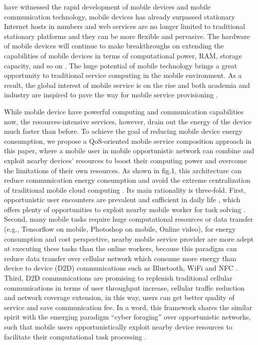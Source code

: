 \documentclass[10pt,journal,compsoc]{IEEEtran}
\begin{document}
 have witnessed the rapid development of mobile devices and mobile communication technology, mobile devices has already surpassed stationary Internet hosts in numbers and web services are no longer limited to traditional stationary platforms and they can be more flexible and pervasive. The hardware of mobile devices will continue to make breakthroughs on extending the capabilities of mobile devices in terms of computational power, RAM, storage capacity, and so on \cite{Deng2017}. The huge potential of mobile technology brings a great opportunity to traditional service computing in the mobile environment. As a result, the global interest of mobile service is on the rise and both academia and industry are inspired to pave the way for mobile service provisioning \cite{dinh2013survey,hu2014multidimensional}.

While mobile device have powerful computing and communication capabilities now, the resources-intensive services, however, drain out the energy of the device much faster than before. 
To achieve the goal of reducing mobile device energy consumption, we propose a QoS-oriented mobile service composition approach in this paper, where a mobile user in mobile opportunistic network can combine and exploit nearby devices' resources to boost their computing power and overcome the limitations of their own resources. As shown in fig.1, this architecture can reduce communication energy consumption and avoid the extreme centralization of traditional mobile cloud computing \cite{Giordano2011}. Its main rationality is three-fold. First, opportunistic user encounters are prevalent and sufficient in daily life \cite{liu2013exploring}, which offers plenty of opportunities to exploit nearby mobile worker for task solving \cite{chang2015progressive,heimerl2012communitysourcing,agapie2015crowdsourcing}. Second, many mobile tasks require huge computational resources or data transfer (e.g., Tensorflow on mobile, Photoshop on mobile, Online video), for energy consumption and cost perspective, nearby mobile service provider are more adept at executing these tasks than the online workers, because this paradigm can reduce data transfer over cellular network which consume more energy than device to device (D2D) communications such as Bluetooth, WiFi and NFC \cite{Balani}. Third, D2D communications are promising to replenish traditional cellular communications in terms of user throughput increase, cellular traffic reduction and network coverage extension, in this way, users can get better quality of service and save communication fee\cite{asadi2014survey}. In a word, this framework shares the similar spirit with the emerging paradigm “cyber foraging” over opportunistic networks, such that mobile users opportunistically exploit nearby device resources to facilitate their computational task processing \cite{shi2012serendipity,li2014can,zhang2015offloading}.
\end{document}
